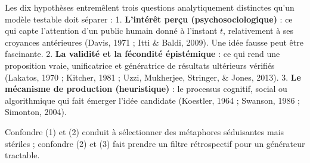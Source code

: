 \documentclass[a4paper,11pt]{article}
\begin{document}
Les dix hypothèses entremêlent trois questions analytiquement distinctes
qu'un modèle testable doit séparer : 1. \textbf{L'intérêt perçu
(psychosociologique)} : ce qui capte l'attention d'un public humain
donné à l'instant \(t\), relativement à ses croyances antérieures
(Davis, 1971 ; Itti \& Baldi, 2009). Une idée fausse peut être
fascinante. 2. \textbf{La validité et la fécondité épistémique} : ce qui
rend une proposition vraie, unificatrice et génératrice de résultats
ultérieurs vérifiés (Lakatos, 1970 ; Kitcher, 1981 ; Uzzi, Mukherjee,
Stringer, \& Jones, 2013). 3. \textbf{Le mécanisme de production
(heuristique)} : le processus cognitif, social ou algorithmique qui fait
émerger l'idée candidate (Koestler, 1964 ; Swanson, 1986 ; Simonton,
2004).

Confondre (1) et (2) conduit à sélectionner des métaphores séduisantes
mais stériles ; confondre (2) et (3) fait prendre un filtre rétrospectif
pour un générateur tractable.
\end{document}
